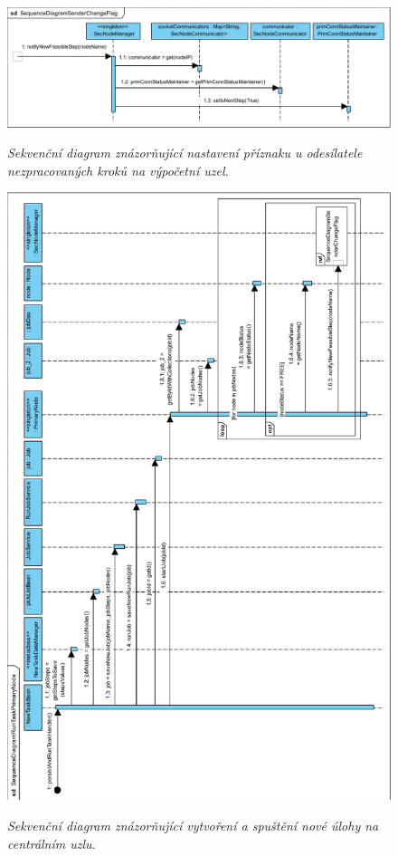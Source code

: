 \begin{figure}[H]
\begin{center}
    \scalebox{0.5}
    {
        \includegraphics{images/SequenceDiagramSenderChangeFlag.pdf}
    }
    \caption{\label{obr:sequenceDiagramRunTaskPrimaryNodeSenderChangeFlag} {\it Sekvenční diagram znázorňující nastavení příznaku u odesílatele nezpracovaných kroků na výpočetní uzel.}}
\end{center}
\end{figure}

\begin{figure}[H]
\begin{center}
    \scalebox{0.5}
    {
        \includegraphics{images/SequenceDiagramRunTaskPrimaryNode.pdf}
    }
    \caption{\label{obr:sequenceDiagramRunTaskPrimaryNode} {\it Sekvenční diagram znázorňující vytvoření a spuštění nové úlohy na centrálním uzlu.}}
\end{center}
\end{figure}

